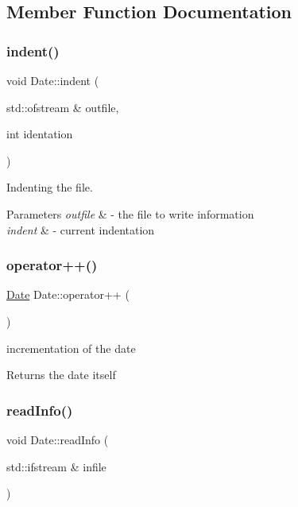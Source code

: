 \subsection{Member Function Documentation}
\mbox{\label{class_date_af439b0bc0daf90fddce7c74017407a16}} 
\subsubsection{\texorpdfstring{indent()}{indent()}}
{\footnotesize\ttfamily void Date\+::indent (\begin{DoxyParamCaption}\item[{std\+::ofstream \&}]{outfile,  }\item[{int}]{identation }\end{DoxyParamCaption})}



Indenting the file. 


\begin{DoxyParams}{Parameters}
{\em outfile} & -\/ the file to write information \\
\hline
{\em indent} & -\/ current indentation \\
\hline
\end{DoxyParams}
\mbox{\label{class_date_a0c5386da90c6834a3e7a110b02e2abaa}} 
\subsubsection{\texorpdfstring{operator++()}{operator++()}}
{\footnotesize\ttfamily \mbox{\hyperlink{class_date}{Date}} Date\+::operator++ (\begin{DoxyParamCaption}{ }\end{DoxyParamCaption})}



incrementation of the date 

\begin{DoxyReturn}{Returns}
the date itself 
\end{DoxyReturn}
\mbox{\label{class_date_ad23dffa000ed62018a399c519acb06db}} 
\subsubsection{\texorpdfstring{read\+Info()}{readInfo()}}
{\footnotesize\ttfamily void Date\+::read\+Info (\begin{DoxyParamCaption}\item[{std\+::ifstream \&}]{infile }\end{DoxyParamCaption})}



